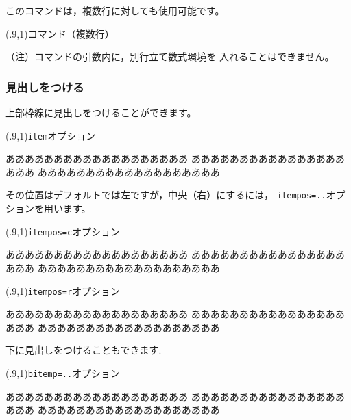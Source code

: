 このコマンドは，複数行に対しても使用可能です。

\begin{showEx}(.9,1){コマンド（複数行）}
\end{showEx}

（注）コマンドの引数内に，別行立て数式環境を
入れることはできません。

\subsubsection{見出しをつける}
上部枠線に見出しをつけることができます。

\begin{showEx}(.9,1){\texttt{item}オプション}
\begin{rectbox}[item={~見出し~}]
あああああああああああああああああああ
あああああああああああああああああああ
あああああああああああああああああああ
\end{rectbox}
\end{showEx}

その位置はデフォルトでは左ですが，中央（右）にするには，
\verb+itempos=..+オプションを用います。

\begin{showEx}(.9,1){\texttt{itempos=c}オプション}
\begin{rectbox}[item={~中央見出し~},itempos=c]
あああああああああああああああああああ
あああああああああああああああああああ
あああああああああああああああああああ
\end{rectbox}
\end{showEx}

\begin{showEx}(.9,1){\texttt{itempos=r}オプション}
\begin{rectbox}[item={~右見出し~},itempos=r]
あああああああああああああああああああ
あああああああああああああああああああ
あああああああああああああああああああ
\end{rectbox}
\end{showEx}

下に見出しをつけることもできます.

\begin{showEx}(.9,1){\texttt{bitemp=..}オプション}
\begin{rectbox}[bitem={~下見出し~}]
あああああああああああああああああああ
あああああああああああああああああああ
あああああああああああああああああああ
\end{rectbox}
\end{showEx}

